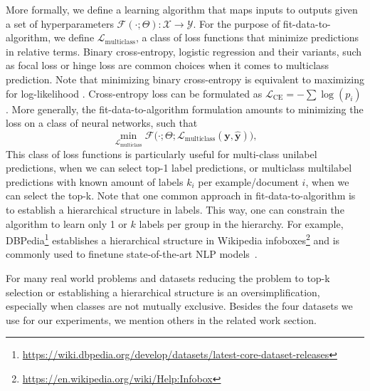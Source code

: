 More formally, we define a learning algorithm that maps inputs to outputs given a set of hyperparameters \(\mathcal{F}(\cdot ; \Theta): \mathcal{X} \rightarrow \mathcal{Y}\). For the purpose of fit-data-to-algorithm,
we define \(\mathcal{L}_{\text {multiclass}}\), a class of loss functions that
minimize predictions in relative terms. Binary cross-entropy, logistic regression and their
variants, such as focal loss or hinge loss are common choices when it comes to
multiclass prediction. Note that minimizing binary cross-entropy is equivalent to maximizing for log-likelihood
\cite[Section 4.3.4]{Bishop}. 
Cross-entropy loss can be formulated as
\(\mathcal{L}_{\text {CE}}=-\sum \log \left(p_{i}\right)\). 
More generally, the fit-data-to-algorithm formulation amounts to minimizing the loss on a class of neural networks, such that
% 
\begin{equation}
\underset{\mathcal{L}_{\text {multiclass}}} {\min} \mathcal{F}\big(\cdot ;
\Theta; \mathcal{L}_{\text {multiclass}} (\mathbf{y}, \hat{\mathbf{y}})\big),
\end{equation}
%
This class of loss functions is particularly useful for multi-class unilabel predictions, when we can select top-1 label predictions, or multiclass multilabel predictions with known amount of labels $k_i$ per example/document $i$, when we can select the top-k. Note that one common approach in fit-data-to-algorithm is to establish a hierarchical structure in labels. This way, one can constrain the algorithm to learn only 1 or $k$ labels per group in the hierarchy. For example, DBPedia\footnote{\url{https://wiki.dbpedia.org/develop/datasets/latest-core-dataset-releases} } establishes a hierarchical structure in Wikipedia infoboxes\footnote{\url{https://en.wikipedia.org/wiki/Help:Infobox} } and is commonly used to finetune state-of-the-art NLP models~\citep[see, e.g.,][]{XLNet, ULMFit}.

For many real world problems and datasets reducing the problem to top-k selection or establishing a hierarchical structure is an oversimplification, especially when classes are not mutually exclusive. Besides the four datasets we use for our experiments, we mention others in the related work section.

